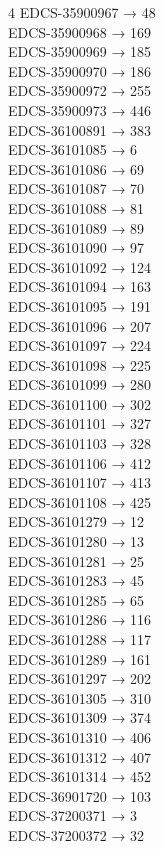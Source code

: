 \begin{multicols}{4}
EDCS-35900967 → 48\\
EDCS-35900968 → 169\\
EDCS-35900969 → 185\\
EDCS-35900970 → 186\\
EDCS-35900972 → 255\\
EDCS-35900973 → 446\\
EDCS-36100891 → 383\\
EDCS-36101085 → 6\\
EDCS-36101086 → 69\\
EDCS-36101087 → 70\\
EDCS-36101088 → 81\\
EDCS-36101089 → 89\\
EDCS-36101090 → 97\\
EDCS-36101092 → 124\\
EDCS-36101094 → 163\\
EDCS-36101095 → 191\\
EDCS-36101096 → 207\\
EDCS-36101097 → 224\\
EDCS-36101098 → 225\\
EDCS-36101099 → 280\\
EDCS-36101100 → 302\\
EDCS-36101101 → 327\\
EDCS-36101103 → 328\\
EDCS-36101106 → 412\\
EDCS-36101107 → 413\\
EDCS-36101108 → 425\\
EDCS-36101279 → 12\\
EDCS-36101280 → 13\\
EDCS-36101281 → 25\\
EDCS-36101283 → 45\\
EDCS-36101285 → 65\\
EDCS-36101286 → 116\\
EDCS-36101288 → 117\\
EDCS-36101289 → 161\\
EDCS-36101297 → 202\\
EDCS-36101305 → 310\\
EDCS-36101309 → 374\\
EDCS-36101310 → 406\\
EDCS-36101312 → 407\\
EDCS-36101314 → 452\\
EDCS-36901720 → 103\\
EDCS-37200371 → 3\\
EDCS-37200372 → 32\\

\end{multicols}

